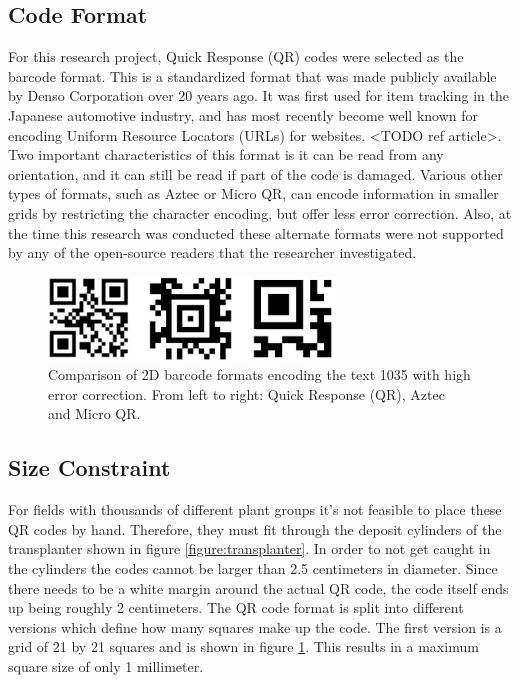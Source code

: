 \subsection{Code Format}
\label{section:code_format}

For this research project, Quick Response (QR) codes were selected as the barcode format. This is a standardized format that was made publicly available by Denso Corporation over 20 years ago.  It was first used for item tracking in the Japanese automotive industry, and has most recently become well known for encoding Uniform Resource Locators (URLs) for websites. <TODO ref article>.  Two important characteristics of this format is it can be read from any orientation, and it can still be read if part of the code is damaged.  Various other types of formats, such as Aztec or Micro QR, can encode information in smaller grids by restricting the character encoding, but offer less error correction.  Also, at the time this research was conducted these alternate formats were not supported by any of the open-source readers that the researcher investigated. 

\begin{figure}[htb]
	\centering
    \includegraphics[width=3in]{figures/generated_codes_1035.jpg}
    \caption[2D barcode formats]{Comparison of 2D barcode formats encoding the text 1035 with high error correction.  From left to right: Quick Response (QR), Aztec and Micro QR.}
    \label{barcode_formats}
\end{figure} 

\subsection{Size Constraint}

For fields with thousands of different plant groups it's not feasible to place these QR codes by hand.  Therefore, they must fit through the deposit cylinders of the transplanter shown in figure \ref{figure:transplanter}.  In order to not get caught in the cylinders the codes cannot be larger than 2.5 centimeters in diameter. Since there needs to be a white margin around the actual QR code, the code itself ends up being roughly 2 centimeters.  The QR code format is split into different versions which define how many squares make up the code.  The first version is a grid of 21 by 21 squares and is shown in figure \ref{barcode_formats}.  This results in a maximum square size of only 1 millimeter.  

